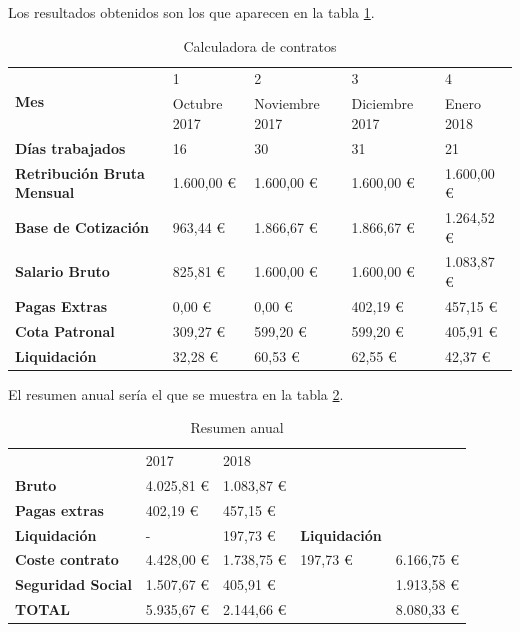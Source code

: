 Los resultados obtenidos son los que aparecen en la tabla \ref{fig:calc_cont}.


\begin{table}[htpb]
\centering
\begin{tabularx}{\textwidth}{|X|X|X|X|X|}
\hline
\multirow{2}{*}{\textbf{Mes}}      & 1            & 2              & 3              & 4          \\ \cline{2-5} 
                                   & Octubre 2017 & Noviembre 2017 & Diciembre 2017 & Enero 2018 \\ \hline
\textbf{Días trabajados}           & 16           & 30             & 31             & 21         \\ \hline
\textbf{Retribución Bruta Mensual} & 1.600,00 €   & 1.600,00 €     & 1.600,00 €     & 1.600,00 € \\ \hline
\textbf{Base de Cotización}        & 963,44 €     & 1.866,67 €     & 1.866,67 €     & 1.264,52 € \\ \hline
\textbf{Salario Bruto}             & 825,81 €     & 1.600,00 €     & 1.600,00 €     & 1.083,87 € \\ \hline
\textbf{Pagas Extras}              & 0,00 €       & 0,00 €         & 402,19 €       & 457,15 €   \\ \hline
\textbf{Cota Patronal}             & 309,27 €     & 599,20 €       & 599,20 €       & 405,91 €   \\ \hline
\textbf{Liquidación}               & 32,28 €      & 60,53 €        & 62,55 €        & 42,37 €    \\ \hline
\end{tabularx}
\caption{Calculadora de contratos}
\label{fig:calc_cont}
\end{table}


El resumen anual sería el que se muestra en la tabla \ref{fig:res_anual}.

\begin{table}[htpb]
\centering
\begin{tabular}{|l|l|l|l|l|}
\hline
\textbf{}                 & 2017       & 2018       & \multicolumn{2}{l|}{\multirow{3}{*}{}} \\ \cline{1-3}
\textbf{Bruto}            & 4.025,81 € & 1.083,87 € & \multicolumn{2}{l|}{}                  \\ \cline{1-3}
\textbf{Pagas extras}     & 402,19 €   & 457,15 €   & \multicolumn{2}{l|}{}                  \\ \hline
\textbf{Liquidación}      & -          & 197,73 €   & \textbf{Liquidación}    &              \\ \hline
\textbf{Coste contrato}   & 4.428,00 € & 1.738,75 € & 197,73 €                & 6.166,75 €   \\ \hline
\textbf{Seguridad Social} & 1.507,67 € & 405,91 €   &                         & 1.913,58 €   \\ \hline
\textbf{TOTAL}            & 5.935,67 € & 2.144,66 € &                         & 8.080,33 €   \\ \hline
\end{tabular}
\caption{Resumen anual}
\label{fig:res_anual}
\end{table}


